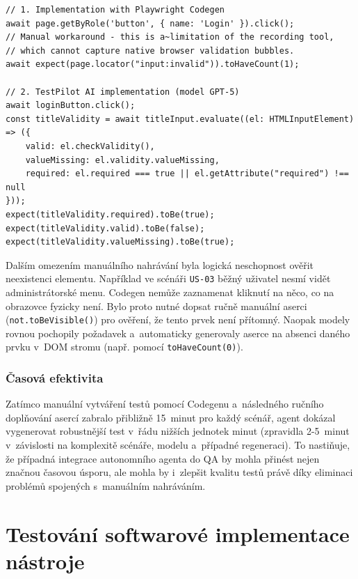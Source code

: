 \documentclass[czech, ing, kiv, he, iso690numb, viewonly]{fasthesis}
\begin{document}
\begin{lstlisting}[style=tscode,
    caption={\protect\centering Porovnání manuálního řešení a~přístupu modelu GPT-5~při ověřování nativní validace formuláře.},
    label={testing:manual-vs-ai},
    basicstyle=\ttfamily\scriptsize,
    float=false]
// 1. Implementation with Playwright Codegen
await page.getByRole('button', { name: 'Login' }).click();
// Manual workaround - this is a~limitation of the recording tool, 
// which cannot capture native browser validation bubbles.
await expect(page.locator("input:invalid")).toHaveCount(1);

// 2. TestPilot AI implementation (model GPT-5)
await loginButton.click();
const titleValidity = await titleInput.evaluate((el: HTMLInputElement) => ({
    valid: el.checkValidity(),
    valueMissing: el.validity.valueMissing,
    required: el.required === true || el.getAttribute("required") !== null
}));
expect(titleValidity.required).toBe(true);
expect(titleValidity.valid).toBe(false);
expect(titleValidity.valueMissing).toBe(true);
\end{lstlisting}


Dalším omezením manuálního nahrávání byla logická neschopnost ověřit neexistenci
elementu. Například ve scénáři \texttt{US-03} běžný uživatel nesmí vidět 
administrátorské menu. Codegen nemůže zaznamenat kliknutí na něco, co na obrazovce fyzicky není.
Bylo proto nutné dopsat ručně manuální aserci (\texttt{not.toBeVisible()}) pro ověření, že tento prvek není přítomný.
Naopak modely rovnou pochopily požadavek a~automaticky generovaly 
aserce na absenci daného prvku v~DOM stromu (např. pomocí \texttt{toHaveCount(0)}).

\subsubsection*{Časová efektivita}

Zatímco manuální vytváření testů pomocí Codegenu a~následného ručního doplňování asercí zabralo 
přibližně 15~minut pro každý scénář, agent dokázal vygenerovat robustnější test v~řádu 
nižších jednotek minut (zpravidla 2-5~minut v~závislosti na komplexitě scénáře, modelu a~případné regeneraci).
To nastiňuje, že případná integrace autonomního agenta do QA by 
mohla přinést nejen značnou časovou úsporu, ale mohla by i~zlepšit kvalitu 
testů právě díky eliminaci problémů spojených s~manuálním nahráváním.



\section{Testování softwarové implementace nástroje}
\end{document}
